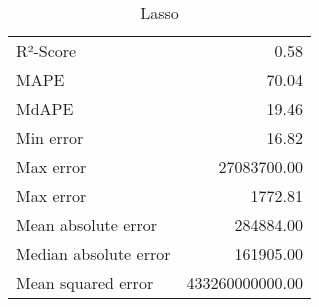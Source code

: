 \begin{table*}[ht]
\begin{minipage}{.3\textwidth}
{\begin{tabular}{@{}lr@{}}
\midrule
            R²-Score & 0.58\\
            MAPE & 70.04\\
            MdAPE & 19.46\\
            Min error & 16.82\\
            Max error & 27083700.00\\
            Max error  & 1772.81\\
            Mean absolute error & 284884.00\\
            Median absolute error & 161905.00\\
            Mean squared error & 433260000000.00\\
\bottomrule
\end{tabular}}
\caption{Lasso}
\end{minipage}
\end{table*}
                